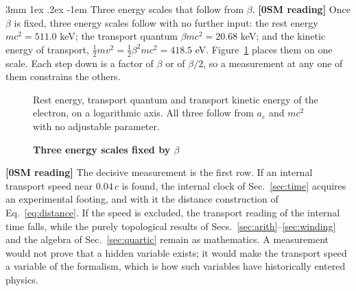 \documentclass[%
 reprint, amsmath,amssymb, aps, prb, ]{revtex4-2}
\makeatletter
\numberwithin{equation}{section}
\renewcommand\paragraph{%
  \@startsection{paragraph}{4}{\z@}%
    {3mm \@plus 1ex \@minus .2ex}
    {-1em}
    {\normalfont\normalsize\itshape}}
\makeatother
\begin{document}
\paragraph{Three energy scales that follow from $\beta$.} \textbf{[0SM reading]} Once $\beta$ is fixed, three energy scales follow with no further input: the rest energy $mc^2=511.0$ keV; the transport quantum $\beta mc^2=20.68$ keV; and the kinetic energy of transport, $\tfrac12mv^2=\tfrac12\beta^2mc^2=418.5$ eV. Figure~\ref{fig:scales} places them on one scale. Each step down is a factor of $\beta$ or of $\beta/2$, so a measurement at any one of them constrains the others.

\begin{figure}[t!]
\centering
{}
\caption{\textbf{Three energy scales fixed by $\beta$}}
\label{fig:scales}
\vspace{0.4em}
\begin{minipage}{0.95\columnwidth}
\justifying\small
Rest energy, transport quantum and transport kinetic energy of the electron, on a logarithmic axis. All three follow from $a_e$ and $mc^2$ with no adjustable parameter.
\end{minipage}
\end{figure}

\textbf{[0SM reading]} The decisive measurement is the first row. If an internal transport speed near $0.04\,c$ is found, the internal clock of Sec.~\ref{sec:time} acquires an experimental footing, and with it the distance construction of Eq.~\eqref{eq:distance}. If the speed is excluded, the transport reading of the internal time falls, while the purely topological results of Secs.~\ref{sec:arith}--\ref{sec:winding} and the algebra of Sec.~\ref{sec:quartic} remain as mathematics. A measurement would not prove that a hidden variable exists; it would make the transport speed a variable of the formalism, which is how such variables have historically entered physics.
\end{document}
